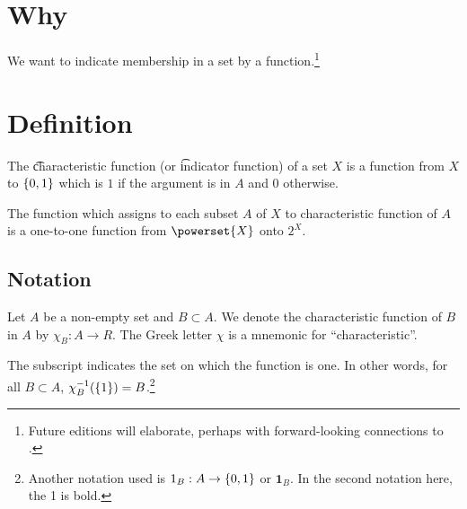 

\section*{Why}

We want to indicate membership in a set by a function.\footnote{Future editions will elaborate, perhaps with forward-looking connections to .}

\section*{Definition}

The \t{characteristic function} (or \t{indicator function}) of a set $X$ is a function from $X$ to $\{0,1\}$ which is $1$ if the argument is in $A$ and 0 otherwise.

The function which assigns to each subset $A$ of $X$ to characteristic function of $A$ is a one-to-one function from $\powerset{X}$ onto $2^{X}$.

\subsection*{Notation}

Let $A$ be a non-empty set and $B \subset A$.
We denote the characteristic function of $B$ in $A$ by $\chi _{B}: A \to R$.
The Greek letter $\chi $ is a mnemonic for ``characteristic''.

The subscript indicates the set on which the function is one.
In other words, for all $B \subset A$, $\chi _{B}^{-1}(\{1\}) = B$.\footnote{Another notation used is $1_{B}: A \to \{0, 1\}$ or $\mathbf{1}_B$.
In the second notation here, the 1 is bold.}

\blankpage